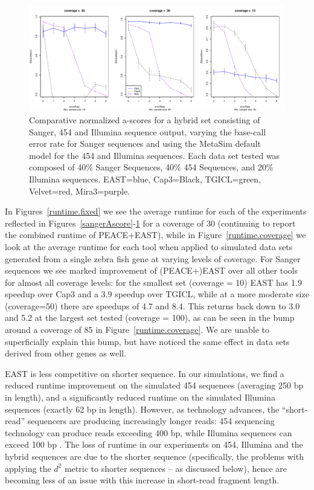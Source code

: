 \documentclass[10pt]{bmc_article}
\newcommand{\peace} {{\small PEACE}}
\newcommand{\capthree} {{\small Cap3}}
\newcommand{\tgicl} {{\small TGICL}}
\newcommand{\east} {{\small EAST}}
\newcommand{\velvet}{{\small Velvet}}
\newcommand{\mira}{{\small Mira3}}
\newenvironment{bmcformat}{\begin{raggedright}\baselineskip20pt\sloppy\setboolean{publ}{false}}{\end{raggedright}\baselineskip20pt\sloppy}
\begin{document}
\begin{bmcformat}
\begin{figure}[htb]
\centerline{\includegraphics[width=6in]{pics.d/ascore_hybrid.pdf}}
\caption{Comparative normalized a-scores for a hybrid set consisting
  of Sanger, 454 and Illumina sequence output, varying the base-call
  error rate for Sanger sequences and using the MetaSim default model
  for the 454 and Illumina sequences.  Each data set tested was
  composed of 40\% Sanger Sequences, 40\% 454 Sequences, and 20\%
  Illumina sequences.  \east=blue, \capthree=Black, \tgicl=green,
  \velvet=red, \mira=purple.}
\label{hybridAscore}
\end{figure}

 In Figures~\ref{runtime.fixed} we see
the average runtime for each of the experiments reflected in
Figures~\ref{sangerAscore}-\ref{hybridAscore} for a coverage of 30
(continuing to report the combined runtime of \peace+\east), while in
Figure~\ref{runtime.coverage} we look at the average runtime for each
tool when applied to simulated data sets generated from a single zebra
fish gene at varying levels of coverage.  For Sanger sequences we
see marked improvement of (\peace+)\east\/ over all other tools for
almost all coverage levels: for the smallest set (coverage = 10)
\east\/ has 1.9 speedup over \capthree\/ and a 3.9 speedup over
\tgicl, while at a more moderate size (coverage=50) there are speedups of
4.7 and 8.4.  This returns back down to 3.0 and 5.2 at the largest set
tested (coverage = 100), as can be seen in the bump around a coverage
of 85 in Figure~\ref{runtime.coverage}.  We are unable to
superficially explain this bump, but have noticed the same effect in
data sets derived from other genes as well.

\vspace{3mm}

\east\/ is less competitive on shorter sequence.  In our simulations,
we find a reduced runtime improvement on the simulated 454 sequences
(averaging 250 bp in length), and a significantly reduced runtime on
the simulated Illumina sequences (exactly 62 bp in length).  However,
as technology advances, the ``short-read'' sequencers are producing
increasingly longer reads: 454 sequencing technology can produce
reads exceeding 400 bp, while Illumina sequences can exceed 100 bp
\cite{Eid09,Li10}.  The loss of runtime in our experiments on 454,
Illumina and the hybrid sequences are due to the shorter sequence
(specifically, the problems with applying the $d^2$ metric to shorter
sequences -- as discussed below), hence are becoming less of an issue
with this increase in short-read fragment length.


\end{bmcformat}
\end{document}
